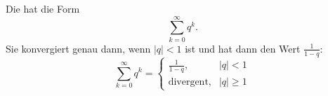 Die  hat die Form
$$\sum_{k=0}^\infty q^k.$$
Sie konvergiert genau dann, wenn $|q| < 1$ ist und hat dann den Wert $\frac{1}{1-q}$:
$$\sum_{k=0}^\infty q^k = \begin{cases}
    \frac{1}{1-q}, & |q| < 1 \\
    \text{divergent}, & |q| \geq 1
\end{cases}$$